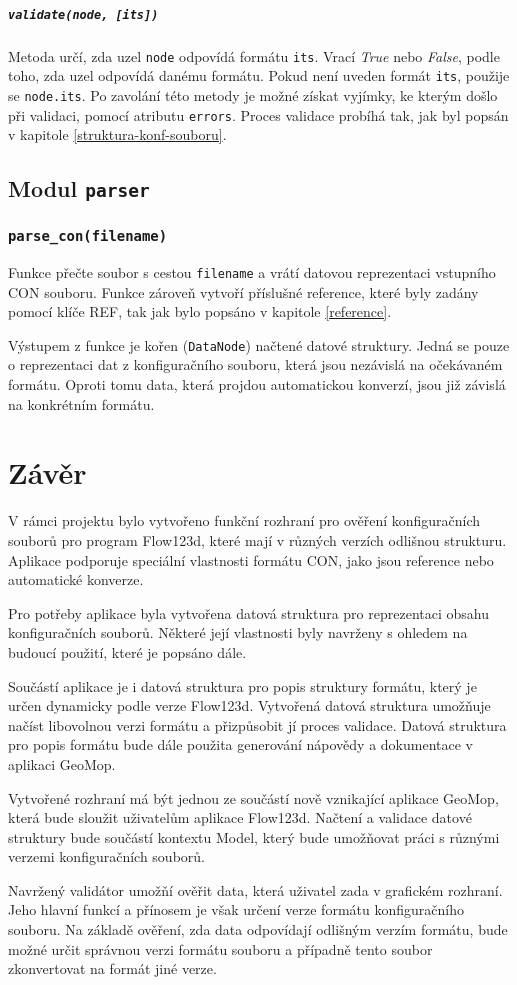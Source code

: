 \documentclass[FM,MP]{tulthesis}
\begin{document}
				\paragraph{\texttt{validate(node, [its])}}
					Metoda určí, zda uzel \texttt{node} odpovídá formátu \texttt{its}. Vrací \textit{True} nebo \textit{False}, podle toho, zda uzel odpovídá danému formátu. Pokud není uveden formát \texttt{its}, použije se \texttt{node.its}. Po zavolání této metody je možné získat vyjímky, ke kterým došlo při validaci, pomocí atributu \texttt{errors}. Proces validace probíhá tak, jak byl popsán v kapitole \ref{struktura-konf-souboru}.


	\section{Modul \texttt{parser}}
		\subsection*{\texttt{parse\_con(filename)}}
			Funkce přečte soubor s cestou \texttt{filename} a vrátí datovou reprezentaci vstupního CON souboru. Funkce zároveň vytvoří příslušné reference, které byly zadány pomocí klíče REF, tak jak bylo popsáno v kapitole \ref{reference}.

			Výstupem z funkce je kořen (\texttt{DataNode}) načtené datové struktury. Jedná se pouze o reprezentaci dat z konfiguračního souboru, která jsou nezávislá na očekávaném formátu. Oproti tomu data, která projdou automatickou konverzí, jsou již závislá na konkrétním formátu.

\chapter{Závěr}
	V rámci projektu bylo vytvořeno funkční rozhraní pro ověření konfiguračních souborů pro program Flow123d, které mají v různých verzích odlišnou strukturu. Aplikace podporuje speciální vlastnosti formátu CON, jako jsou reference nebo automatické konverze.

	Pro potřeby aplikace byla vytvořena datová struktura pro reprezentaci obsahu konfiguračních souborů. Některé její vlastnosti byly navrženy s ohledem na budoucí použití, které je popsáno dále.

	Součástí aplikace je i datová struktura pro popis struktury formátu, který je určen dynamicky podle verze Flow123d. Vytvořená datová struktura umožňuje načíst libovolnou verzi formátu a přizpůsobit jí proces validace. Datová struktura pro popis formátu bude dále použita generování nápovědy a dokumentace v aplikaci GeoMop.

	Vytvořené rozhraní má být jednou ze součástí nově vznikající aplikace GeoMop, která bude sloužit uživatelům aplikace Flow123d. Načtení a validace datové struktury bude součástí kontextu Model, který bude umožňovat práci s různými verzemi konfiguračních souborů.

	Navržený validátor umožňí ověřit data, která uživatel zada v grafickém rozhraní. Jeho hlavní funkcí a přínosem je však určení verze formátu konfiguračního souboru. Na základě ověření, zda data odpovídají odlišným verzím formátu, bude možné určit správnou verzi formátu souboru a případně tento soubor zkonvertovat na formát jiné verze.
\end{document}
